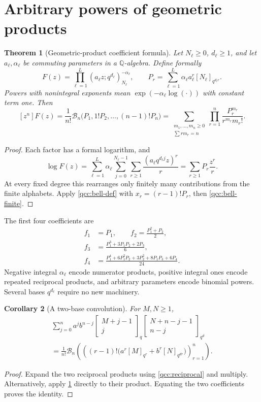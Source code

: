 \documentclass[11pt,a4paper,oneside,openany]{book}
\newtheorem{theorem}{Theorem}[chapter]
\newtheorem{corollary}[theorem]{Corollary}
\theoremstyle{definition}
\theoremstyle{remark}
\newcommand{\Q}{\mathbb Q}
\newcommand{\GB}[3][q]{\begin{bmatrix}#2\\#3\end{bmatrix}_{#1}}
\newcommand{\qi}[2][q]{[#2]_{#1}}
\newcommand{\Y}[1]{\mathcal B_{#1}}
\begin{document}
\section{Arbitrary powers of geometric products}
\begin{theorem}[Geometric-product coefficient formula]\label{qcc:master-theorem}
Let \(N_\ell\ge0\), \(d_\ell\ge1\), and let \(a_\ell,\alpha_\ell\) be
commuting parameters in a \(\Q\)-algebra. Define formally
\begin{equation}\label{qcc:master-product}
 F(z)=\prod_{\ell=1}^L(a_\ell z;q^{d_\ell})_{N_\ell}^{-\alpha_\ell},
 \qquad
 P_r=\sum_{\ell=1}^L\alpha_\ell a_\ell^r\qi[q^{d_\ell r}]{N_\ell}.
\end{equation}
Powers with nonintegral exponents mean \(\exp(-\alpha_\ell\log(\cdot))\)
with constant term one. Then
\begin{equation}\label{qcc:master-coefficient}
 [z^n]F(z)=\frac1{n!}\Y n\bigl(P_1,1!P_2,\ldots,(n-1)!P_n\bigr)
 =\sum_{\substack{m_1,\ldots,m_n\ge0\\\sum r m_r=n}}
 \prod_{r=1}^n\frac{P_r^{m_r}}{r^{m_r}m_r!}.
\end{equation}
\end{theorem}
\begin{proof}
Each factor has a formal logarithm, and
\[
 \log F(z)
 =\sum_{\ell=1}^L\alpha_\ell\sum_{j=0}^{N_\ell-1}
       \sum_{r\ge1}\frac{(a_\ell q^{d_\ell j}z)^r}{r}
 =\sum_{r\ge1}P_r\frac{z^r}{r}.
\]
At every fixed degree this rearranges only finitely many contributions from the
finite alphabets. Apply \eqref{qcc:bell-def} with
\(x_r=(r-1)!P_r\), then \eqref{qcc:bell-finite}.
\end{proof}
The first four coefficients are
\begin{align*}
 f_1&=P_1,\qquad f_2=\frac{P_1^2+P_2}{2},\\
 f_3&=\frac{P_1^3+3P_1P_2+2P_3}{6},\\
 f_4&=\frac{P_1^4+6P_1^2P_2+3P_2^2+8P_1P_3+6P_4}{24}.
\end{align*}
Negative integral \(\alpha_\ell\) encode numerator products, positive integral
ones encode repeated reciprocal products, and arbitrary parameters encode
binomial powers. Several bases \(q^{d_\ell}\) require no new machinery.

\begin{corollary}[A two-base convolution]\label{qcc:two-base}
For \(M,N\ge1\),
\begin{multline}\label{qcc:two-base-formula}
 \sum_{j=0}^n a^j b^{n-j}
 \GB[q]{M+j-1}j\GB[q^d]{N+n-j-1}{n-j}\\
 =\frac1{n!}\Y n\left(
 \left((r-1)!\bigl(a^r\qi[q^r]M+b^r\qi[q^{dr}]N\bigr)\right)_{r=1}^n
 \right).
\end{multline}
\end{corollary}
\begin{proof}
Expand the two reciprocal products using \eqref{qcc:reciprocal} and multiply.
Alternatively, apply \cref{qcc:master-theorem} directly to their product. Equating
the two coefficients proves the identity.
\end{proof}
\end{document}
